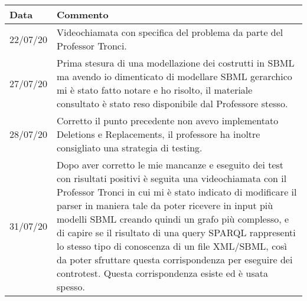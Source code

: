 \documentclass{article}
\begin{document}
\begin{table}[h!t]
    \caption{Cronologia}
    \centering
    \begin{longtable}{p{2cm}p{9cm}}
        \textbf{Data} & \textbf{Commento} \\
        \hline
        22/07/20 & Videochiamata con specifica del problema da parte del Professor Tronci. \\
        \hline
        27/07/20 & Prima stesura di una modellazione dei costrutti in SBML ma avendo io dimenticato di modellare SBML gerarchico mi è stato fatto notare e ho risolto, il materiale consultato è stato reso disponibile dal Professore stesso. \\
        \hline
        28/07/20 & Corretto il punto precedente non avevo implementato Deletions e Replacements, il professore ha inoltre consigliato una strategia di testing. \\
        \hline
        31/07/20 & Dopo aver corretto le mie mancanze e eseguito dei test con risultati positivi è seguita una videochiamata con il Professor Tronci in cui mi è stato indicato di modificare il parser in maniera tale da poter ricevere in input più modelli SBML creando quindi un grafo più complesso, e di capire se il risultato di una query SPARQL rappresenti lo stesso tipo di conoscenza di un file XML/SBML, così da poter sfruttare questa corrispondenza per eseguire dei controtest. Questa corrispondenza esiste ed è usata spesso. \\
        \hline
    \end{longtable}
\end{table}

\cleardoublepage
\end{document}
